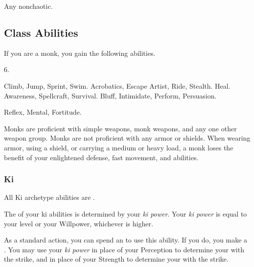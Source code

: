      Any nonchaotic.

    \subsection{Class Abilities}
        If you are a monk, you gain the following abilities.

         6.

         Climb, Jump, Sprint, Swim.
         Acrobatics, Escape Artist, Ride, Stealth.
         Heal.
         Awareness, Spellcraft, Survival.
         Bluff, Intimidate, Perform, Persuasion.

          Reflex,  Mental,  Fortitude.

        Monks are proficient with simple weapons, monk weapons, and any one other weapon group.
        Monks are not proficient with any armor or shields.
        When wearing armor, using a shield, or carrying a medium or heavy load, a monk loses the benefit of your enlightened defense, fast movement, and \ki abilities.

        \subsubsection{Ki}
            All Ki archetype abilities are .

            The  of your ki abilities is determined by your \textit{ki power}.
            Your \textit{ki power} is equal to your level or your Willpower, whichever is higher.

            As a standard action, you can spend an  to use this ability.
            If you do, you make a .
            You may use your \textit{ki power} in place of your Perception to determine your  with the strike, and in place of your Strength to determine your  with the strike.

